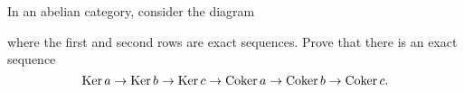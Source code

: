 \begin{sproblem}
	\gim
	In an abelian category, consider the diagram
	\begin{center}
	\end{center}
	where the first and second rows are exact sequences.
	Prove that there is an exact sequence
	\[ \operatorname{Ker} a \to \operatorname{Ker} b \to \operatorname{Ker} c \to \operatorname{Coker} a \to \operatorname{Coker} b \to \operatorname{Coker} c. \]
\end{sproblem}
